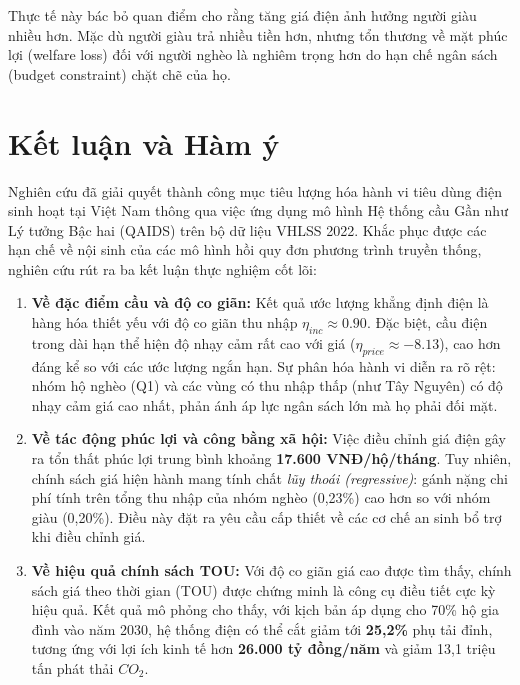 \documentclass[12pt,a4paper,oneside]{article}
\begin{document}
Thực tế này bác bỏ quan điểm cho rằng tăng giá điện ảnh hưởng người giàu nhiều hơn. Mặc dù người giàu trả nhiều tiền hơn, nhưng tổn thương về mặt phúc lợi (welfare loss) đối với người nghèo là nghiêm trọng hơn do hạn chế ngân sách (budget constraint) chặt chẽ của họ.

\section{Kết luận và Hàm ý}
\label{sec:conclusion}

Nghiên cứu đã giải quyết thành công mục tiêu lượng hóa hành vi tiêu dùng điện sinh hoạt tại Việt Nam thông qua việc ứng dụng mô hình Hệ thống cầu Gần như Lý tưởng Bậc hai (QAIDS) trên bộ dữ liệu VHLSS 2022. Khắc phục được các hạn chế về nội sinh của các mô hình hồi quy đơn phương trình truyền thống, nghiên cứu rút ra ba kết luận thực nghiệm cốt lõi:

\begin{enumerate}
	\item \textbf{Về đặc điểm cầu và độ co giãn:} 
	Kết quả ước lượng khẳng định điện là hàng hóa thiết yếu với độ co giãn thu nhập $\eta_{inc} \approx 0.90$. Đặc biệt, cầu điện trong dài hạn thể hiện độ nhạy cảm rất cao với giá ($\eta_{price} \approx -8.13$), cao hơn đáng kể so với các ước lượng ngắn hạn. Sự phân hóa hành vi diễn ra rõ rệt: nhóm hộ nghèo (Q1) và các vùng có thu nhập thấp (như Tây Nguyên) có độ nhạy cảm giá cao nhất, phản ánh áp lực ngân sách lớn mà họ phải đối mặt.
	
	\item \textbf{Về tác động phúc lợi và công bằng xã hội:} 
	Việc điều chỉnh giá điện gây ra tổn thất phúc lợi trung bình khoảng \textbf{17.600 VNĐ/hộ/tháng}. Tuy nhiên, chính sách giá hiện hành mang tính chất \textit{lũy thoái (regressive)}: gánh nặng chi phí tính trên tổng thu nhập của nhóm nghèo (0,23\%) cao hơn so với nhóm giàu (0,20\%). Điều này đặt ra yêu cầu cấp thiết về các cơ chế an sinh bổ trợ khi điều chỉnh giá.
	
	\item \textbf{Về hiệu quả chính sách TOU:} 
	Với độ co giãn giá cao được tìm thấy, chính sách giá theo thời gian (TOU) được chứng minh là công cụ điều tiết cực kỳ hiệu quả. Kết quả mô phỏng cho thấy, với kịch bản áp dụng cho 70\% hộ gia đình vào năm 2030, hệ thống điện có thể cắt giảm tới \textbf{25,2\%} phụ tải đỉnh, tương ứng với lợi ích kinh tế hơn \textbf{26.000 tỷ đồng/năm} và giảm 13,1 triệu tấn phát thải $CO_2$.
\end{enumerate}
\end{document}
